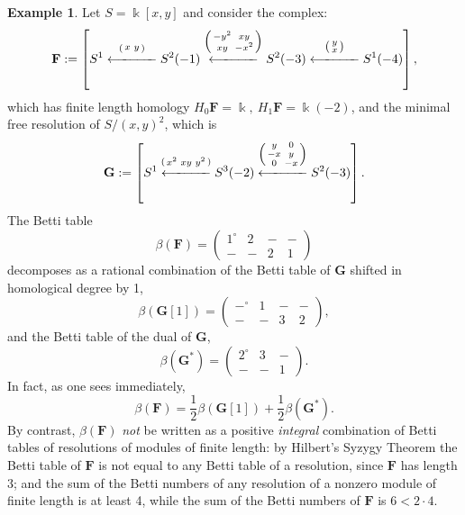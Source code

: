 \documentclass[12pt]{amsart}
\theoremstyle{definition}
\newtheorem{example}[lemma]{Example}
\theoremstyle{remark}
\newcommand{\kk}{\Bbbk}
\newcommand{\bG}{\mathbf{G}}
\newcommand{\FF}{\mathbf{F}}
\begin{document}
\begin{example}
Let $S=\kk[x,y]$ and consider the complex:
\[
\FF := \left[S^1\overset{\left(\begin{smallmatrix}x&y\end{smallmatrix}\right)}{\xlongleftarrow{\hspace*{1.1cm}}} S^2(-1)\overset{\left(\begin{smallmatrix}-y^2&xy\\xy&-x^2\end{smallmatrix}\right)}{\xlongleftarrow{\hspace*{1.1cm}}} S^2(-3)\overset{\left(\begin{smallmatrix}y\\x\end{smallmatrix}\right)}{\xlongleftarrow{\hspace*{1.1cm}}} S^1(-4)\right],
\]
which has finite length homology $H_{0}\FF = \kk,\ H_{1}\FF = \kk(-2)$, and the minimal free resolution of $S/(x,y)^{2}$, which 
is
\[
\bG := 
\left[S^1\overset{\left(\begin{smallmatrix}x^{2}&xy&y^{2}\end{smallmatrix}\right)}
{\xlongleftarrow{\hspace*{1.1cm}}} 
S^3(-2)\overset{\left(\begin{smallmatrix}y&0\\-x&y\\0&-x\end{smallmatrix}\right)}{\xlongleftarrow{\hspace*{1.1cm}}} S^2(-3)\right].
\]
The Betti table
$$
\beta(\FF)=\begin{pmatrix} 1^\circ&2&-&-\\-&-&2&1\end{pmatrix}
$$
decomposes as a rational combination of the Betti table of $\bG$ shifted in 
homological degree by 1,
$$
\beta(\bG[1]) =\begin{pmatrix} -^{\circ}&1&-&-\\-&-&3&2\end{pmatrix},
$$
and the Betti table of the dual of $\bG$, 
$$
\beta(\bG^{*}) = \begin{pmatrix} 2^\circ&3&-\\-&-&1\end{pmatrix}.
$$
In fact, as one sees immediately,
\[
\beta(\FF)=
\frac{1}{2}\beta(\bG[1])
+
\frac{1}{2}\beta(\bG^{*}).
\]
By contrast, $\beta(\FF)$ \emph{not} be written as a positive \emph{integral} combination of Betti tables of resolutions of modules of finite length: by Hilbert's Syzygy Theorem the Betti table of $\FF$  is not equal to any Betti table of a resolution, since $\FF$ has length 3; and the sum of the Betti numbers of any resolution of a nonzero module of finite length is at least 4, while the sum of the Betti numbers of $\FF$ is $6<2\cdot 4$.
\end{example}
\end{document}
